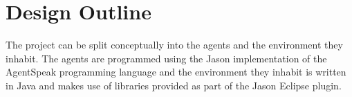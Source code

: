 \section{Design Outline}

The project can be split conceptually into the agents and the environment they inhabit. The agents are programmed using the Jason implementation of the AgentSpeak programming language and the environment they inhabit is written in Java and makes use of libraries provided as part of the Jason Eclipse plugin.